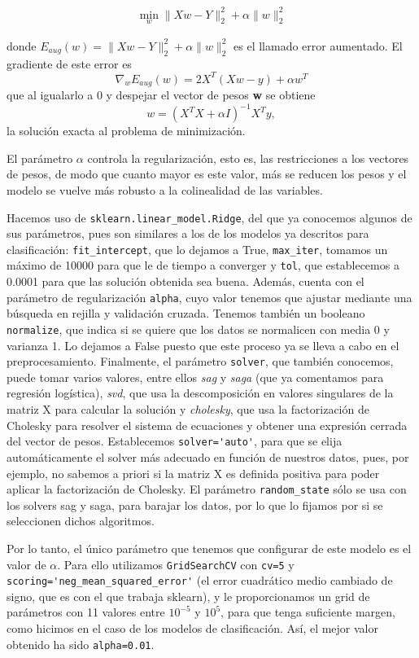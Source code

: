 \documentclass[a4]{article}
\begin{document}
\begin{align*}
\min\limits_{w}\|Xw-Y\|_2^2 + \alpha \|w\|_2^2
\end{align*}

donde $E_{aug}(w)=\|Xw-Y\|_2^2 + \alpha \|w\|_2^2$ es el llamado error aumentado. El gradiente de este error es $$ \nabla_{w} E_{aug}(w)=2X^T(Xw-y)+\alpha w^T$$ que al igualarlo a 0 y despejar el vector de pesos \textbf{w} se obtiene $$w=(X^TX+\alpha I)^{-1}X^Ty,$$ la solución exacta al problema de minimización. 

El parámetro $\alpha$ controla la regularización, esto es, las restricciones a los vectores de  pesos, de modo que cuanto mayor es este valor, más se reducen los pesos y el modelo se vuelve más robusto a la colinealidad de las variables. 

Hacemos uso de \lstinline|sklearn.linear_model.Ridge|, del que ya conocemos algunos de sus parámetros, pues son similares a los de los modelos ya descritos para clasificación: \lstinline|fit_intercept|, que lo dejamos a True, \lstinline|max_iter|, tomamos un máximo de 10000 para que le de tiempo a converger y \lstinline|tol|, que establecemos a 0.0001 para que las solución obtenida sea buena. Además, cuenta con el parámetro de regularización \lstinline|alpha|, cuyo valor tenemos que ajustar mediante una búsqueda en rejilla y validación cruzada. Tenemos también un booleano \lstinline|normalize|, que indica si se quiere que los datos se normalicen con media 0 y varianza 1. Lo dejamos a False puesto que este proceso ya se lleva a cabo en el preprocesamiento. Finalmente, el parámetro \lstinline|solver|, que también conocemos, puede tomar varios valores, entre ellos \textit{sag} y \textit{saga} (que ya comentamos para regresión logística), \textit{svd}, que usa la descomposición en valores singulares de la matriz X para calcular la solución y \textit{cholesky}, que usa la factorización de Cholesky para resolver el sistema de ecuaciones y obtener una expresión cerrada del vector de pesos. Establecemos \lstinline|solver='auto'|, para que se elija automáticamente el solver más adecuado en función de nuestros datos, pues, por ejemplo, no sabemos a priori si la matriz X es definida positiva para poder aplicar la factorización de Cholesky. 
El parámetro \lstinline|random_state| sólo se usa con los solvers sag y saga, para barajar los datos, por lo que lo fijamos por si se seleccionen dichos algoritmos.  

Por lo tanto, el único parámetro que tenemos que configurar de este modelo es el valor de $\alpha$. Para ello utilizamos \lstinline|GridSearchCV| con \lstinline|cv=5| y \lstinline|scoring='neg_mean_squared_error'| (el error cuadrático medio cambiado de signo, que es con el que trabaja sklearn), y le proporcionamos un grid de parámetros con 11 valores entre $10^{-5}$ y $10^5$, para que tenga suficiente margen, como hicimos en el caso de los modelos de clasificación. Así, el mejor valor obtenido ha sido \lstinline|alpha=0.01|.  
\end{document}
